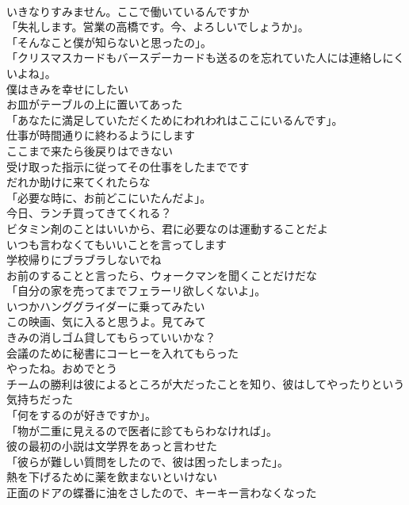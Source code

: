 \documentclass[8pt]{extreport}
\begin{document}
\begin{CJK}{UTF8}{min}
\\	いきなりすみません。ここで働いているんですか	
\\	「失礼します。営業の高橋です。今、よろしいでしょうか」。	
\\	「そんなこと僕が知らないと思ったの」。	
\\	「クリスマスカードもバースデーカードも送るのを忘れていた人には連絡しにくいよね」。	
\\	僕はきみを幸せにしたい	
\\	お皿がテーブルの上に置いてあった	
\\	「あなたに満足していただくためにわれわれはここにいるんです」。	
\\	仕事が時間通りに終わるようにします	
\\	ここまで来たら後戻りはできない	
\\	受け取った指示に従ってその仕事をしたまでです	
\\	だれか助けに来てくれたらな	
\\	「必要な時に、お前どこにいたんだよ」。	
\\	今日、ランチ買ってきてくれる？	
\\	ビタミン剤のことはいいから、君に必要なのは運動することだよ	
\\	いつも言わなくてもいいことを言ってします	
\\	学校帰りにブラブラしないでね	
\\	お前のすることと言ったら、ウォークマンを聞くことだけだな	
\\	「自分の家を売ってまでフェラーリ欲しくないよ」。	
\\	いつかハンググライダーに乗ってみたい	
\\	この映画、気に入ると思うよ。見てみて	
\\	きみの消しゴム貸してもらっていいかな？	
\\	会議のために秘書にコーヒーを入れてもらった	
\\	やったね。おめでとう	
\\	チームの勝利は彼によるところが大だったことを知り、彼はしてやったりという気持ちだった	
\\	「何をするのが好きですか」。	
\\	「物が二重に見えるので医者に診てもらわなければ」。	
\\	彼の最初の小説は文学界をあっと言わせた	
\\	「彼らが難しい質問をしたので、彼は困ったしまった」。	
\\	熱を下げるために薬を飲まないといけない	
\\	正面のドアの蝶番に油をさしたので、キーキー言わなくなった	

\end{CJK}
\end{document}
